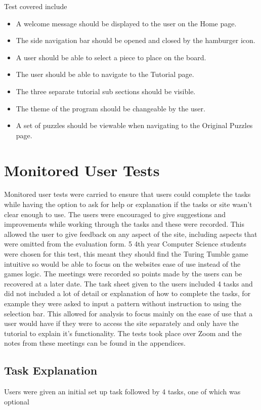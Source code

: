 \documentclass{l4proj}
\begin{document}
Test covered include 
\begin{itemize}
    \item A welcome message should be displayed to the user on the Home page.
    \item The side navigation bar should be opened and closed by the hamburger icon.
    \item A user should be able to select a piece to place on the board.
    \item The user should be able to navigate to the Tutorial page.
    \item The three separate tutorial sub sections should be visible.
    \item The theme of the program should be changeable by the user.
    \item A set of puzzles should be viewable when navigating to the Original Puzzles page.
\end{itemize}

\section{Monitored User Tests}
Monitored user tests were carried to ensure that users could complete the tasks while having the option to ask for help or explanation if the tasks or site wasn't clear enough to use. The users were encouraged to give suggestions and improvements while working through the tasks and these were recorded. This allowed the user to give feedback on any aspect of the site, including aspects that were omitted from the evaluation form. 5 4th year Computer Science students were chosen for this test, this meant they should find the Turing Tumble game intuitive so would be able to focus on the websites ease of use instead of the games logic. The meetings were recorded so points made by the users can be recovered at a later date. The task sheet given to the users included 4 tasks and did not included a lot of detail or explanation of how to complete the tasks, for example they were asked to input a pattern without instruction to using the selection bar. This allowed for analysis to focus mainly on the ease of use that a user would have if they were to access the site separately and only have the tutorial to explain it's functionality. The tests took place over Zoom and the notes from these meetings can be found in the appendices.

\subsection{Task Explanation}
\label{taskExplanation}
Users were given an initial set up task followed by 4 tasks, one of which was optional
\end{document}
